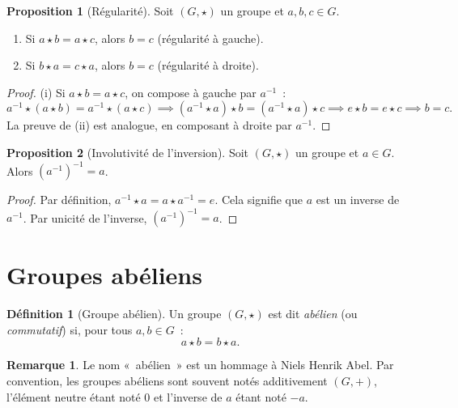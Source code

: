 \documentclass[12pt,a4paper,openany]{book}
\theoremstyle{definition}
\newtheorem{definition}{Définition}[chapter]
\newtheorem{proposition}{Proposition}[chapter]
\newtheorem{remarque}{Remarque}[chapter]
\begin{document}
\begin{proposition}[Régularité]
\label{prop:regularite}
Soit $(G, \star)$ un groupe et $a, b, c \in G$.
\begin{enumerate}[label=(\roman*)]
  \item Si $a \star b = a \star c$, alors $b = c$ \textup{(régularité à gauche)}.
  \item Si $b \star a = c \star a$, alors $b = c$ \textup{(régularité à droite)}.
\end{enumerate}
\end{proposition}

\begin{proof}
(i) Si $a \star b = a \star c$, on compose à gauche par $a^{-1}$~:
\[
  a^{-1} \star (a \star b) = a^{-1} \star (a \star c)
  \implies (a^{-1} \star a) \star b = (a^{-1} \star a) \star c
  \implies e \star b = e \star c
  \implies b = c.
\]
La preuve de (ii) est analogue, en composant à droite par $a^{-1}$.
\end{proof}

\begin{proposition}[Involutivité de l'inversion]
\label{prop:involution-inverse}
Soit $(G, \star)$ un groupe et $a \in G$. Alors $(a^{-1})^{-1} = a$.
\end{proposition}

\begin{proof}
Par définition, $a^{-1} \star a = a \star a^{-1} = e$. Cela signifie que $a$ est un
inverse de $a^{-1}$. Par unicité de l'inverse, $(a^{-1})^{-1} = a$.
\end{proof}

\section{Groupes abéliens}
\label{sec:ch1-abelien}

\begin{definition}[Groupe abélien]
\label{def:abelien}
Un groupe $(G, \star)$ est dit \emph{abélien} (ou \emph{commutatif}) si, pour tous $a,
b \in G$~:
\[
  a \star b = b \star a.
\]
\end{definition}

\begin{remarque}
Le nom «~abélien~» est un hommage à Niels Henrik Abel. Par convention, les
groupes abéliens sont souvent notés additivement $(G, +)$, l'élément neutre étant noté
$0$ et l'inverse de $a$ étant noté $-a$.
\end{remarque}
\end{document}
